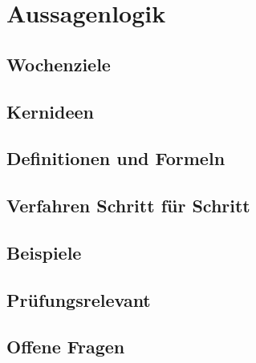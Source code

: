 \chapter{Aussagenlogik}
\label{kap:02-aussagenlogik}

\section*{Wochenziele}
\begin{wochenziele}
\end{wochenziele}

\section{Kernideen}

\section{Definitionen und Formeln}

\section{Verfahren Schritt für Schritt}

\section{Beispiele}

\section{Prüfungsrelevant}

\section{Offene Fragen}
